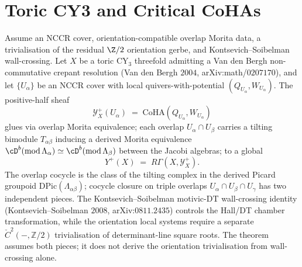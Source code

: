 \providecommand{\PhiFA}{\Phi^{\mathrm{FA}}}
\providecommand{\HolFA}{\mathrm{HolFA}}
\providecommand{\EdHolFA}{E_d\text{-}\HolFA}
\providecommand{\EnHolFA}{E_n\text{-}\HolFA}
\providecommand{\SpCh}{\mathrm{Sp}^{\mathrm{ch}}}
\providecommand{\intSigma}{\textstyle\int_{\Sigma_{d-1}}}
\providecommand{\hCS}{\mathrm{hCS}}
\providecommand{\cY}{\mathcal{Y}}
\providecommand{\Gm}{\mathbb{G}_m}
\providecommand{\bY}{\mathbb{Y}}

\chapter{Toric CY3 and Critical CoHAs}
\label{ch:toric-coha}

\begin{theorem}
\label{thm:toric-coha-cech-descent}
Assume an NCCR cover, orientation-compatible overlap Morita data, a
trivialisation of the residual $\Z/2$ orientation gerbe, and
Kontsevich--Soibelman wall-crossing.
Let $X$ be a toric $\mathrm{CY}_3$ threefold admitting a Van den Bergh non-commutative crepant resolution (Van den Bergh $2004$, arXiv:math/$0207170$), and let $\{U_\alpha\}$ be an NCCR cover with local quivers-with-potential $(Q_{U_\alpha}, W_{U_\alpha})$. The positive-half sheaf
\[
 \cY^+_X(U_\alpha) \;=\; \mathrm{CoHA}(Q_{U_\alpha}, W_{U_\alpha})
\]
glues via overlap Morita equivalence; each overlap $U_\alpha \cap U_\beta$ carries a tilting bimodule $T_{\alpha\beta}$ inducing a derived Morita equivalence $\cD^b(\mathrm{mod}\,\Lambda_\alpha) \simeq \cD^b(\mathrm{mod}\,\Lambda_\beta)$ between the Jacobi algebras; to a global
\[
 Y^+(X) \;=\; R\Gamma(X, \cY^+_X).
\]
The overlap cocycle is the class of the tilting complex in the derived Picard groupoid $\mathrm{DPic}(\Lambda_{\alpha\beta})$; cocycle closure on triple overlaps $U_\alpha \cap U_\beta \cap U_\gamma$ has two independent pieces. The Kontsevich--Soibelman motivic-DT wall-crossing identity (Kontsevich--Soibelman $2008$, arXiv:$0811.2435$) controls the Hall/DT chamber transformation, while the orientation local systems require a separate $\check C^2(-,\mathbb Z/2)$ trivialisation of determinant-line square roots. The theorem assumes both pieces; it does not derive the orientation trivialisation from wall-crossing alone.
\end{theorem}

